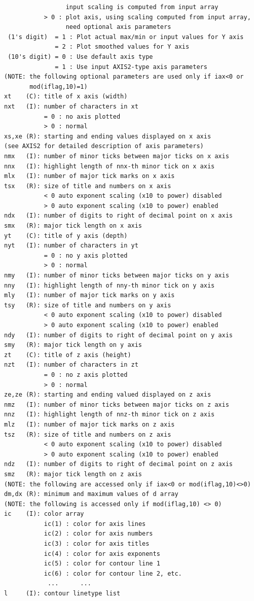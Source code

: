 \documentclass[11pt]{report}
\begin{document}
\begin{verbatim}
                 input scaling is computed from input array
           > 0 : plot axis, using scaling computed from input array,
                 need optional axis parameters
 (1's digit)  = 1 : Plot actual max/min or input values for Y axis
              = 2 : Plot smoothed values for Y axis
 (10's digit) = 0 : Use default axis type
              = 1 : Use input AXIS2-type axis parameters
(NOTE: the following optional parameters are used only if iax<0 or 
       mod(iflag,10)=1)
xt    (C): title of x axis (width)
nxt   (I): number of characters in xt
           = 0 : no axis plotted
           > 0 : normal
xs,xe (R): starting and ending values displayed on x axis
(see AXIS2 for detailed description of axis parameters)
nmx   (I): number of minor ticks between major ticks on x axis
nnx   (I): highlight length of nnx-th minor tick on x axis
mlx   (I): number of major tick marks on x axis
tsx   (R): size of title and numbers on x axis
           < 0 auto exponent scaling (x10 to power) disabled
           > 0 auto exponent scaling (x10 to power) enabled
ndx   (I): number of digits to right of decimal point on x axis
smx   (R): major tick length on x axis
yt    (C): title of y axis (depth)
nyt   (I): number of characters in yt
           = 0 : no y axis plotted
           > 0 : normal
nmy   (I): number of minor ticks between major ticks on y axis
nny   (I): highlight length of nny-th minor tick on y axis
mly   (I): number of major tick marks on y axis
tsy   (R): size of title and numbers on y axis
           < 0 auto exponent scaling (x10 to power) disabled
           > 0 auto exponent scaling (x10 to power) enabled
ndy   (I): number of digits to right of decimal point on y axis
smy   (R): major tick length on y axis
zt    (C): title of z axis (height)
nzt   (I): number of characters in zt
           = 0 : no z axis plotted
           > 0 : normal
ze,ze (R): starting and ending valued displayed on z axis
nmz   (I): number of minor ticks between major ticks on z axis
nnz   (I): highlight length of nnz-th minor tick on z axis
mlz   (I): number of major tick marks on z axis
tsz   (R): size of title and numbers on z axis
           < 0 auto exponent scaling (x10 to power) disabled
           > 0 auto exponent scaling (x10 to power) enabled
ndz   (I): number of digits to right of decimal point on z axis
smz   (R): major tick length on z axis
(NOTE: the following are accessed only if iax<0 or mod(iflag,10)<>0)
dm,dx (R): minimum and maximum values of d array
(NOTE: the following is accessed only if mod(iflag,10) <> 0)
ic    (I): color array
           ic(1) : color for axis lines
           ic(2) : color for axis numbers
           ic(3) : color for axis titles
           ic(4) : color for axis exponents
           ic(5) : color for contour line 1
           ic(6) : color for contour line 2, etc.
            ...      ...
l     (I): contour linetype list
\end{verbatim}
\end{document}
